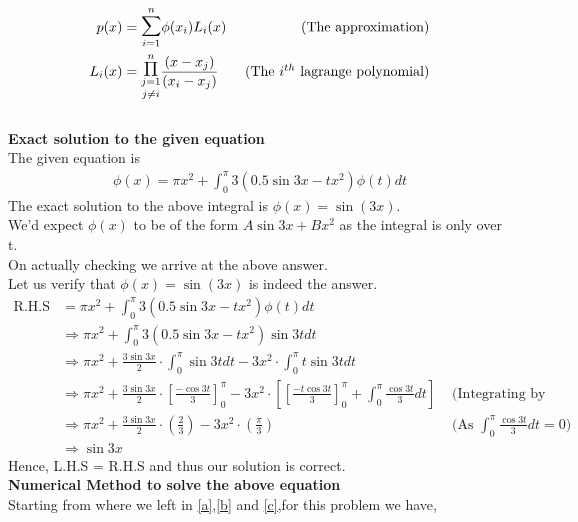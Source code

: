 \documentclass[letterpaper]{exam}
\begin{document}
\begin{questions}
\begin{solution}
\begin{align}\label{c}
 p(x) &= \overset{n}{\underset{i=1}{\mathlarger{\mathlarger{\sum}}}} \phi(x_i)L_i(x) &\mbox{ (The approximation)}\\
 L_i(x) &= \overset{n}{\underset{j \neq i}{\underset{j=1}{\mathlarger{\mathlarger{\Pi}}}}} \frac{(x - x_j)}{(x_i-x_j)} &\mbox{ (The $i^{th}$ lagrange polynomial)} 
\end{align}
\\
\textbf{Exact solution to the given equation}\\
The given equation is
\begin{align*}
        \phi(x) = \pi x^2 + \int_{0}^{\pi} 3\left(0.5\sin{3x} - tx^2\right)\phi(t)dt
\end{align*}
The exact solution to the above integral is $\phi(x) = \sin{(3x)}$.\\
We'd expect $\phi(x)$ to be of the form $A\sin{3x} + Bx^2$ as the integral is only over t.\\
On actually checking we arrive at the above answer.\\
Let us verify that $\phi(x) = \sin{(3x)}$ is indeed the answer.\\
\begin{align*}
    \text{R.H.S} &= \pi x^2 + \int_{0}^{\pi} 3\left(0.5\sin{3x} - tx^2\right)\phi(t)dt\\
    &\Rightarrow
    \pi x^2 + \int_{0}^{\pi} 3\left(0.5\sin{3x} - tx^2\right)\sin{3t}dt\\
    &\Rightarrow
    \pi x^2 + \frac{3\sin{3x}}{2}\cdot \int_{0}^{\pi} \sin{3t}dt -3x^2 \cdot \int_{0}^{\pi} t\sin{3t}dt\\
    &\Rightarrow
    \pi x^2 + \frac{3\sin{3x}}{2}\cdot \left[\frac{-\cos{3t}}{3}\right]_{0}^{\pi} - 3x^2 \cdot \left[\left[\frac{-t\cos{3t}}{3}\right]_{0}^{\pi} + \int_{0}^{\pi} \frac{\cos{3t}}{3} dt \right] &\mbox{ (Integrating by parts)}\\
    &\Rightarrow
    \pi x^2 + \frac{3\sin{3x}}{2}\cdot\left(\frac{2}{3}\right) - 3x^2 \cdot \left(\frac{\pi}{3}\right) &\mbox{ (As $\int_{0}^{\pi} \frac{\cos{3t}}{3} dt = 0$)}\\
    &\Rightarrow
    \sin{3x}
\end{align*}
Hence, L.H.S = R.H.S and thus our solution is correct.
\\
\textbf{Numerical Method to solve the above equation}\\
Starting from where we left in \ref{a},\ref{b} and \ref{c},for this problem we have,
\begin{align*}

\end{align*}
\end{solution}
\end{questions}
\end{document}
